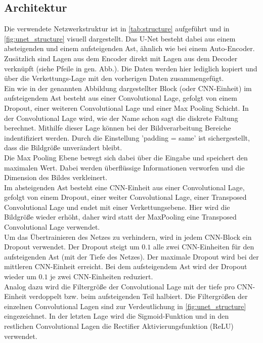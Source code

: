 \subsection{Architektur}
Die verwendete Netzwerkstruktur ist in \autoref{tab:structure} aufgeführt und in \autoref{fig:unet_structure} visuell dargestellt.
Das U-Net besteht dabei aus einem absteigenden und einem aufsteigenden Ast, ähnlich wie bei einem Auto-Encoder.
Zusätzlich sind Lagen aus dem Encoder direkt mit Lagen aus dem Decoder verknüpft (siehe Pfeile in gen. Abb.).
Die Daten werden hier lediglich kopiert und über die Verkettungs-Lage mit den vorherigen Daten zusammengefügt.
\\
Ein wie in der genannten Abbildung dargestellter Block (oder CNN-Einheit) im aufsteigendem Ast besteht aus einer Convolutional Lage, gefolgt von einem Dropout, einer weiteren Convolutional Lage und einer Max Pooling Schicht.
In der Convolutional Lage wird, wie der Name schon sagt die diskrete Faltung berechnet.
Mithilfe dieser Lage können bei der Bildverarbeitung Bereiche indentifiziert werden.
Durch die Einstellung 'padding = same' ist sichergestellt, dass die Bildgröße unverändert bleibt.
\\
Die Max Pooling Ebene bewegt sich dabei über die Eingabe und speichert den maximalen Wert.
Dabei werden überflüssige Informationen verworfen und die Dimension des Bildes verkleinert.
\\
Im absteigenden Ast besteht eine CNN-Einheit aus einer Convolutional Lage, gefolgt von einem Dropout, einer weiter Convolutional Lage, einer Transposed Convolutional Lage und endet mit einer Verkettungsebene.
Hier wird die Bildgröße wieder erhöht, daher wird statt der MaxPooling eine Transposed Convolutional Lage verwendet.
\\
Um das Übertrainieren des Netzes zu verhindern, wird in jedem CNN-Block ein Dropout verwendet.
Der Dropout steigt um $0.1$ alle zwei CNN-Einheiten für den aufsteigenden Ast (mit der Tiefe des Netzes).
Der maximale Dropout wird bei der mittleren CNN-Einheit erreicht.
Bei dem aufsteigendem Ast wird der Dropout wieder um $0.1$ je zwei CNN-Einheiten reduziert.
\\
Analog dazu wird die Filtergröße der Convolutional Lage mit der tiefe pro CNN-Einheit verdoppelt bzw. beim aufsteigenden Teil halbiert.
Die Filtergrößen der einzelnen Convolutional Lagen sind zur Verdeutlichung in \autoref{fig:unet_structure} eingezeichnet.
In der letzten Lage wird die Sigmoid-Funktion und in den restlichen Convolutional Lagen die Rectifier Aktivierungsfunktion (ReLU) verwendet.
